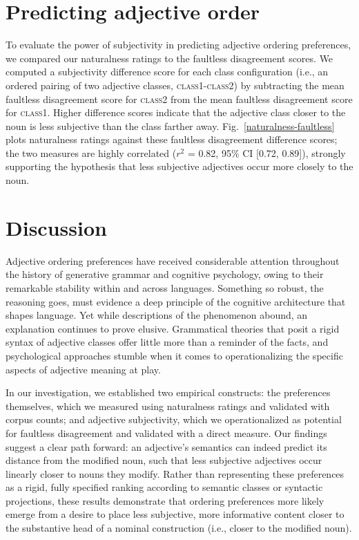 \documentclass{pnastwo}
\begin{document}
\begin{article}
\section{Predicting adjective order}

To evaluate the power of subjectivity in predicting adjective ordering preferences, we compared our naturalness ratings to the faultless disagreement scores. We  computed a subjectivity difference score for each class configuration (i.e., an ordered pairing of two adjective classes, \textsc{class1}-\textsc{class2}) by subtracting the mean faultless disagreement score for \textsc{class2} from the mean faultless disagreement score for \textsc{class1}. Higher difference scores indicate that the adjective class closer to the noun is less subjective than the class farther away. Fig.~\ref{naturalness-faultless} plots naturalness ratings  against these faultless disagreement difference scores; the two measures are highly correlated ($r^2$ = 0.82, 95\% CI [0.72, 0.89]), strongly supporting the hypothesis that less subjective adjectives occur more closely to the noun.

\section{Discussion}

Adjective ordering preferences have received considerable attention throughout the history of generative grammar and cognitive psychology, owing to their remarkable stability within and across languages. Something so robust, the reasoning goes, must evidence a deep principle of the cognitive architecture that shapes language. Yet while descriptions of the phenomenon abound, an explanation continues to prove elusive. Grammatical theories that posit a rigid syntax of adjective classes offer little more than a reminder of the facts, and psychological approaches stumble when it comes to operationalizing the specific aspects of adjective meaning at play. 

In our investigation, we established two empirical constructs: the preferences themselves, which we measured using naturalness ratings and validated with corpus counts; and adjective subjectivity, which we operationalized as potential for faultless disagreement and validated with a direct measure. Our findings suggest a clear path forward: an adjective's semantics can indeed predict its distance from the modified noun, such that less subjective adjectives occur linearly closer to nouns they modify. Rather than representing these preferences as a rigid, fully specified ranking according to semantic classes or syntactic projections, these results demonstrate that ordering preferences more likely emerge from a desire to place less subjective, more informative content closer to the substantive head of a nominal construction (i.e., closer to the modified noun).




\end{article}
\end{document}
